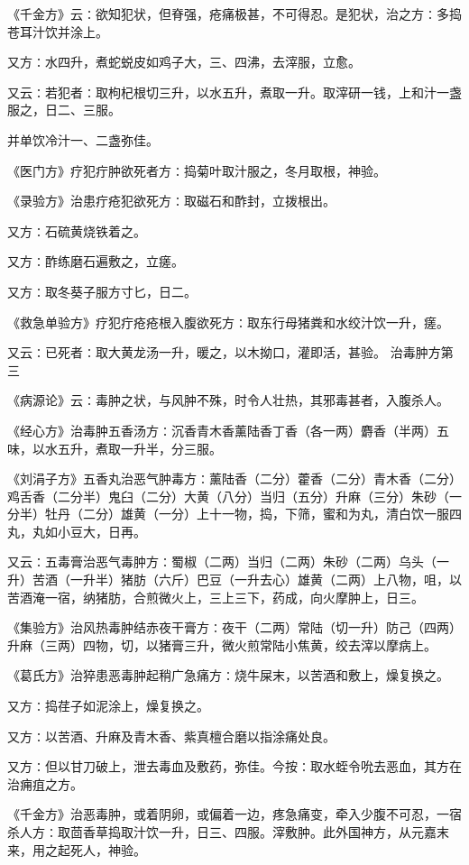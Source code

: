 \documentclass[a4paper,12pt,UTF8,twoside]{ctexbook}
\begin{document}
《千金方》云∶欲知犯状，但脊强，疮痛极甚，不可得忍。是犯状，治之方∶多捣苍耳汁饮并涂上。

又方∶水四升，煮蛇蜕皮如鸡子大，三、四沸，去滓服，立愈。

又云∶若犯者∶取枸杞根切三升，以水五升，煮取一升。取滓研一钱，上和汁一盏服之，日二、三服。

并单饮冷汁一、二盏弥佳。

《医门方》疗犯疔肿欲死者方∶捣菊叶取汁服之，冬月取根，神验。

《录验方》治患疔疮犯欲死方∶取磁石和酢封，立拨根出。

又方∶石硫黄烧铁着之。

又方∶酢练磨石遍敷之，立瘥。

又方∶取冬葵子服方寸匕，日二。

《救急单验方》疗犯疔疮疮根入腹欲死方∶取东行母猪粪和水绞汁饮一升，瘥。

又云∶已死者∶取大黄龙汤一升，暖之，以木拗口，灌即活，甚验。
治毒肿方第三

《病源论》云∶毒肿之状，与风肿不殊，时令人壮热，其邪毒甚者，入腹杀人。

《经心方》治毒肿五香汤方∶沉香青木香薰陆香丁香（各一两）麝香（半两）五味，以水五升，煮取一升半，分三服。

《刘涓子方》五香丸治恶气肿毒方∶薰陆香（二分）藿香（二分）青木香（二分）鸡舌香（二分半）鬼臼（二分）大黄（八分）当归（五分）升麻（三分）朱砂（一分半）牡丹（二分）雄黄（一分）上十一物，捣，下筛，蜜和为丸，清白饮一服四丸，丸如小豆大，日再。

又云∶五毒膏治恶气毒肿方∶蜀椒（二两）当归（二两）朱砂（二两）乌头（一升）苦酒（一升半）猪肪（六斤）巴豆（一升去心）雄黄（二两）上八物，咀，以苦酒淹一宿，纳猪肪，合煎微火上，三上三下，药成，向火摩肿上，日三。

《集验方》治风热毒肿结赤夜干膏方∶夜干（二两）常陆（切一升）防己（四两）升麻（三两）四物，切，以猪膏三升，微火煎常陆小焦黄，绞去滓以摩病上。

《葛氏方》治猝患恶毒肿起稍广急痛方∶烧牛屎末，以苦酒和敷上，燥复换之。

又方∶捣荏子如泥涂上，燥复换之。

又方∶以苦酒、升麻及青木香、紫真檀合磨以指涂痛处良。

又方∶但以甘刀破上，泄去毒血及敷药，弥佳。今按∶取水蛭令吮去恶血，其方在治痈疽之方。

《千金方》治恶毒肿，或着阴卵，或偏着一边，疼急痛变，牵入少腹不可忍，一宿杀人方∶取茴香草捣取汁饮一升，日三、四服。滓敷肿。此外国神方，从元嘉末来，用之起死人，神验。
\end{document}

